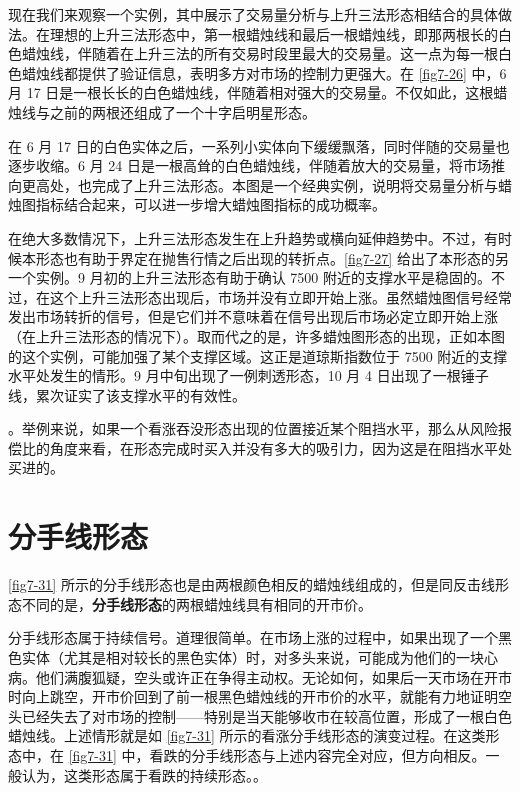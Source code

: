 现在我们来观察一个实例，其中展示了交易量分析与上升三法形态相结合的具体做法。在理想的上升三法形态中，第一根蜡烛线和最后一根蜡烛线，即那两根长的白色蜡烛线，伴随着在上升三法的所有交易时段里最大的交易量。这一点为每一根白色蜡烛线都提供了验证信息，表明多方对市场的控制力更强大。在 \autoref{fig7-26} 中，6 月 17 日是一根长长的白色蜡烛线，伴随着相对强大的交易量。不仅如此，这根蜡烛线与之前的两根还组成了一个十字启明星形态。

在 6 月 17 日的白色实体之后，一系列小实体向下缓缓飘落，同时伴随的交易量也逐步收缩。6 月 24 日是一根高耸的白色蜡烛线，伴随着放大的交易量，将市场推向更高处，也完成了上升三法形态。本图是一个经典实例，说明将交易量分析与蜡烛图指标结合起来，可以进一步增大蜡烛图指标的成功概率。


在绝大多数情况下，上升三法形态发生在上升趋势或横向延伸趋势中。不过，有时候本形态也有助于界定在抛售行情之后出现的转折点。\autoref{fig7-27} 给出了本形态的另一个实例。9 月初的上升三法形态有助于确认 7500 附近的支撑水平是稳固的。不过，在这个上升三法形态出现后，市场并没有立即开始上涨。虽然蜡烛图信号经常发出市场转折的信号，但是它们并不意味着在信号出现后市场必定立即开始上涨（在上升三法形态的情况下）。取而代之的是，许多蜡烛图形态的出现，正如本图的这个实例，可能加强了某个支撑区域。这正是道琼斯指数位于 7500 附近的支撑水平处发生的情形。9 月中旬出现了一例刺透形态，10 月 4 日出现了一根锤子线，累次证实了该支撑水平的有效性。


。举例来说，如果一个看涨吞没形态出现的位置接近某个阻挡水平，那么从风险报偿比的角度来看，在形态完成时买入并没有多大的吸引力，因为这是在阻挡水平处买进的。
\section{分手线形态}
\autoref{fig7-31} 所示的分手线形态也是由两根颜色相反的蜡烛线组成的，但是同反击线形态不同的是，\textbf{分手线形态}的两根蜡烛线具有相同的开市价。

分手线形态属于持续信号。道理很简单。在市场上涨的过程中，如果出现了一个黑色实体（尤其是相对较长的黑色实体）时，对多头来说，可能成为他们的一块心病。他们满腹狐疑，空头或许正在争得主动权。无论如何，如果后一天市场在开市时向上跳空，开市价回到了前一根黑色蜡烛线的开市价的水平，就能有力地证明空头已经失去了对市场的控制——特别是当天能够收市在较高位置，形成了一根白色蜡烛线。上述情形就是如 \autoref{fig7-31} 所示的看涨分手线形态的演变过程。在这类形态中，在 \autoref{fig7-31} 中，看跌的分手线形态与上述内容完全对应，但方向相反。一般认为，这类形态属于看跌的持续形态。。

